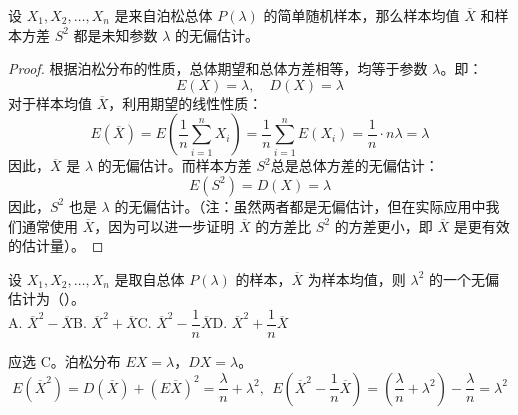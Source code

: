 \documentclass[lang=cn,11pt]{elegantbook}
\begin{document}
\begin{proposition}[泊松分布无偏估计的不唯一性]\label{prop:poisson-unbiased}
    设 $X_1, X_2, \dots, X_n$ 是来自泊松总体 $P(\lambda)$ 的简单随机样本，那么样本均值 $\overline{X}$ 和样本方差 $S^2$ 都是未知参数 $\lambda$ 的无偏估计。
\end{proposition}
\begin{proof}
    根据泊松分布的性质，总体期望和总体方差相等，均等于参数 $\lambda$。即：$$E(X) = \lambda, \quad D(X) = \lambda$$对于样本均值 $\overline{X}$，利用期望的线性性质：
    $$E(\overline{X}) = E\left(\frac{1}{n}\sum_{i=1}^n X_i\right) = \frac{1}{n}\sum_{i=1}^n E(X_i) = \frac{1}{n} \cdot n\lambda = \lambda$$
    因此，$\overline{X}$ 是 $\lambda$ 的无偏估计。而样本方差 $S^2$总是总体方差的无偏估计：$$E(S^2) = D(X) = \lambda$$因此，$S^2$ 也是 $\lambda$ 的无偏估计。（注：虽然两者都是无偏估计，但在实际应用中我们通常使用 $\overline{X}$，因为可以进一步证明 $\overline{X}$ 的方差比 $S^2$ 的方差更小，即 $\overline{X}$ 是更有效的估计量）。
\end{proof}

\begin{exercise}
    设 $X_1,X_2,\dots,X_n$ 是取自总体 $P(\lambda)$ 的样本，$\overline{X}$ 为样本均值，则 $\lambda^2$ 的一个无偏估计为（\quad）。\\
A. $\overline{X}^2 - \overline{X}$\qquad B. $\overline{X}^2 + \overline{X}$\qquad C. $\overline{X}^2 - \dfrac{1}{n}\overline{X}$\qquad D. $\overline{X}^2 + \dfrac{1}{n}\overline{X}$
\end{exercise}
\begin{solution}
应选 C。泊松分布 $EX = \lambda$，$DX = \lambda$。
$$E(\overline{X}^2) = D(\overline{X}) + (E\overline{X})^2 = \frac{\lambda}{n} + \lambda^2,~~E\left(\overline{X}^2 - \frac{1}{n}\overline{X}\right) = \left(\frac{\lambda}{n} + \lambda^2\right) - \frac{\lambda}{n} = \lambda^2$$
\end{solution}
\end{document}
